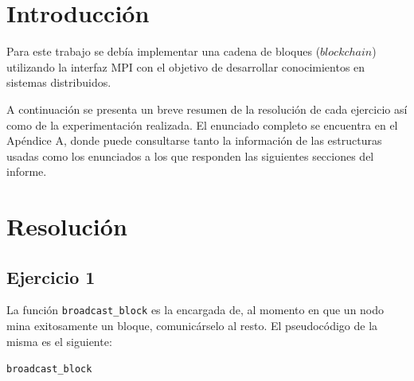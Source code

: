 \documentclass[10pt, a4paper, hidelinks]{article}
\begin{document}

\maketitle

\tableofcontents
{}

\pagebreak
{}
\cfoot{\thepage /\pageref{LastPage}}

\section{Introducción}
Para este trabajo se debía implementar una cadena de bloques ($blockchain$) utilizando la interfaz MPI con el objetivo de desarrollar conocimientos en sistemas distribuidos.

A continuación se presenta un breve resumen de la resolución de cada ejercicio así como de la experimentación realizada. El enunciado completo se encuentra en el Apéndice A, donde puede consultarse tanto la información de las estructuras usadas como los enunciados a los que responden las siguientes secciones del informe.

\section{Resolución}
\subsection{Ejercicio 1}
La función \texttt{broadcast\_block} es la encargada de, al momento en que un nodo mina exitosamente un bloque, comunicárselo al resto. El pseudocódigo de la misma es el siguiente:

\begin{algorithm}[H]
\SetAlgoLined
{}
\caption{\texttt{broadcast\_block}}
\end{algorithm}
\end{document}
